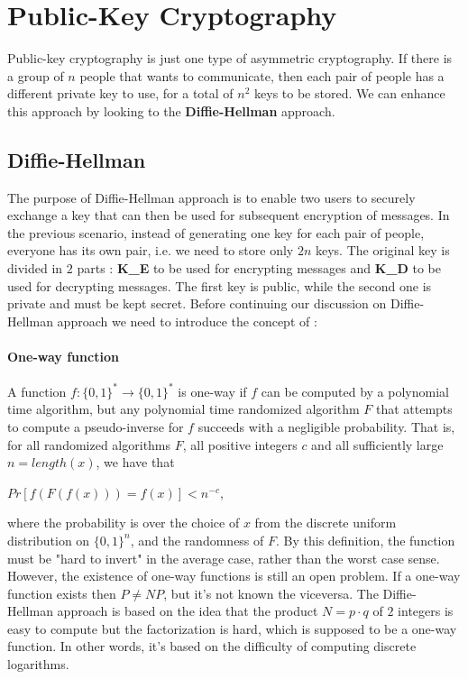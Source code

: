 \documentclass[11pt]{article}
\begin{document}
\section{Public-Key Cryptography}
Public-key cryptography is just one type of asymmetric cryptography. If there is a group of $n$ people that wants to communicate, then each pair of people has a different private key to use, for a total of $n^2$ keys to be stored. We can enhance this approach by looking to the \textbf{Diffie-Hellman} approach.
\subsection{Diffie-Hellman}
The purpose of Diffie-Hellman approach is to enable two users to securely exchange a key that can then be used for subsequent encryption of messages. In the previous scenario, instead of generating one key for each pair of people, everyone has its own pair, i.e. we need to store only $2n$ keys. The original key is divided in $2$ parts : \textbf{K\_E} to be used for encrypting messages and \textbf{K\_D} to be used for decrypting messages. The first key is public, while the second one is private and must be kept secret. Before continuing our discussion on Diffie-Hellman approach we need to introduce the concept of :
\paragraph{One-way function} A function $f : \{0, 1\}^{*} \rightarrow \{0, 1\}^{*}$ is one-way if $f$ can be computed by a polynomial time algorithm, but any polynomial time randomized algorithm $F$ that attempts to compute a pseudo-inverse for $f$ succeeds with a negligible probability. That is, for all randomized algorithms $F$, all positive integers $c$ and all sufficiently large $n = length(x)$, we have that
\begin{center}
$Pr[ f(F(f(x))) = f(x) ] < n^{-c}$,
\end{center} 
where the probability is over the choice of $x$ from the discrete uniform distribution on $\{0, 1\}^{n}$, and the randomness of $F$.
By this definition, the function must be "hard to invert" in the average case, rather than the worst case sense. However, the existence of one-way functions is still an open problem. If a one-way function exists then $P \neq NP$, but it's not known the viceversa. The Diffie-Hellman approach is based on the idea that the product $N = p \cdot q$ of $2$ integers is easy to compute but the factorization is hard, which is supposed to be a one-way function. In other words, it's based on the difficulty of computing discrete logarithms.
\end{document}
